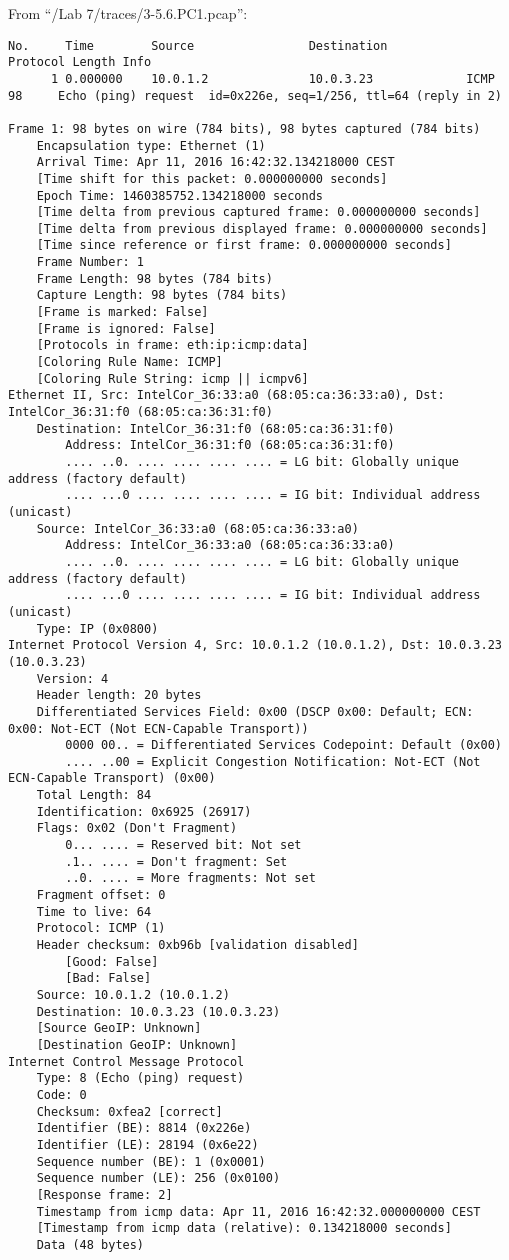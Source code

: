 From ``/Lab 7/traces/3-5.6.PC1.pcap'':
\begin{lstlisting}
No.     Time        Source                Destination           Protocol Length Info
      1 0.000000    10.0.1.2              10.0.3.23             ICMP     98     Echo (ping) request  id=0x226e, seq=1/256, ttl=64 (reply in 2)

Frame 1: 98 bytes on wire (784 bits), 98 bytes captured (784 bits)
    Encapsulation type: Ethernet (1)
    Arrival Time: Apr 11, 2016 16:42:32.134218000 CEST
    [Time shift for this packet: 0.000000000 seconds]
    Epoch Time: 1460385752.134218000 seconds
    [Time delta from previous captured frame: 0.000000000 seconds]
    [Time delta from previous displayed frame: 0.000000000 seconds]
    [Time since reference or first frame: 0.000000000 seconds]
    Frame Number: 1
    Frame Length: 98 bytes (784 bits)
    Capture Length: 98 bytes (784 bits)
    [Frame is marked: False]
    [Frame is ignored: False]
    [Protocols in frame: eth:ip:icmp:data]
    [Coloring Rule Name: ICMP]
    [Coloring Rule String: icmp || icmpv6]
Ethernet II, Src: IntelCor_36:33:a0 (68:05:ca:36:33:a0), Dst: IntelCor_36:31:f0 (68:05:ca:36:31:f0)
    Destination: IntelCor_36:31:f0 (68:05:ca:36:31:f0)
        Address: IntelCor_36:31:f0 (68:05:ca:36:31:f0)
        .... ..0. .... .... .... .... = LG bit: Globally unique address (factory default)
        .... ...0 .... .... .... .... = IG bit: Individual address (unicast)
    Source: IntelCor_36:33:a0 (68:05:ca:36:33:a0)
        Address: IntelCor_36:33:a0 (68:05:ca:36:33:a0)
        .... ..0. .... .... .... .... = LG bit: Globally unique address (factory default)
        .... ...0 .... .... .... .... = IG bit: Individual address (unicast)
    Type: IP (0x0800)
Internet Protocol Version 4, Src: 10.0.1.2 (10.0.1.2), Dst: 10.0.3.23 (10.0.3.23)
    Version: 4
    Header length: 20 bytes
    Differentiated Services Field: 0x00 (DSCP 0x00: Default; ECN: 0x00: Not-ECT (Not ECN-Capable Transport))
        0000 00.. = Differentiated Services Codepoint: Default (0x00)
        .... ..00 = Explicit Congestion Notification: Not-ECT (Not ECN-Capable Transport) (0x00)
    Total Length: 84
    Identification: 0x6925 (26917)
    Flags: 0x02 (Don't Fragment)
        0... .... = Reserved bit: Not set
        .1.. .... = Don't fragment: Set
        ..0. .... = More fragments: Not set
    Fragment offset: 0
    Time to live: 64
    Protocol: ICMP (1)
    Header checksum: 0xb96b [validation disabled]
        [Good: False]
        [Bad: False]
    Source: 10.0.1.2 (10.0.1.2)
    Destination: 10.0.3.23 (10.0.3.23)
    [Source GeoIP: Unknown]
    [Destination GeoIP: Unknown]
Internet Control Message Protocol
    Type: 8 (Echo (ping) request)
    Code: 0
    Checksum: 0xfea2 [correct]
    Identifier (BE): 8814 (0x226e)
    Identifier (LE): 28194 (0x6e22)
    Sequence number (BE): 1 (0x0001)
    Sequence number (LE): 256 (0x0100)
    [Response frame: 2]
    Timestamp from icmp data: Apr 11, 2016 16:42:32.000000000 CEST
    [Timestamp from icmp data (relative): 0.134218000 seconds]
    Data (48 bytes)


\end{lstlisting}
